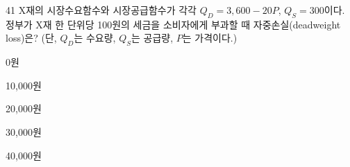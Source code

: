 \begin{question}{41}
X재의 시장수요함수와 시장공급함수가 각각 $Q_D = 3{,}600-20P$, $Q_S = 300$이다. 정부가 X재 한 단위당 100원의 세금을 소비자에게 부과할 때 자중손실(deadweight loss)은? (단, $Q_D$는 수요량, $Q_S$는 공급량, $P$는 가격이다.)
\begin{choices}
  \item 0원
  \item 10,000원
  \item 20,000원
  \item 30,000원
  \item 40,000원
\end{choices}
\end{question}
